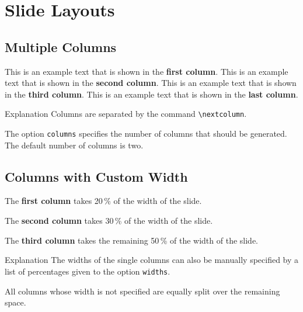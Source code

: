 \documentclass[
	aspectratio=169, %
	8pt, %
]{beamer}
\begin{document}
\section{Slide Layouts}

\subsection{Multiple Columns}
\begin{frame}{\insertsubsection}
	\begin{fancycolumns}[columns=4] %
		This is an example text that is shown in the \textbf{first column}.
	\nextcolumn
		This is an example text that is shown in the \textbf{second column}.
	\nextcolumn
		This is an example text that is shown in the \textbf{third column}.
	\nextcolumn
		This is an example text that is shown in the \textbf{last column}.
	\end{fancycolumns}
	\vfill
	\begin{info}{Explanation}
		Columns are separated by the command \texttt{\textbackslash nextcolumn}.

		The option \texttt{columns} specifies the number of columns that should be generated. The default number of columns is two.
	\end{info}
\end{frame}

\subsection{Columns with Custom Width}
\begin{frame}{\insertsubsection}
	\begin{fancycolumns}[columns=3,widths={20,30}]
		\begin{example}{}
			The \textbf{first column} takes 20\,\% of the width of the slide.
		\end{example}
	\nextcolumn
		\begin{example}{}
			The \textbf{second column} takes 30\,\% of the width of the slide.
		\end{example}
	\nextcolumn
		\begin{example}{}
			The \textbf{third column} takes the remaining 50\,\% of the width of the slide.
		\end{example}
	\end{fancycolumns}
	\vfill
	\begin{info}{Explanation}
		The widths of the single columns can also be manually specified by a list of percentages given to the option \texttt{widths}.

		All columns whose width is not specified are equally split over the remaining space.
	\end{info}
\end{frame}
\end{document}
